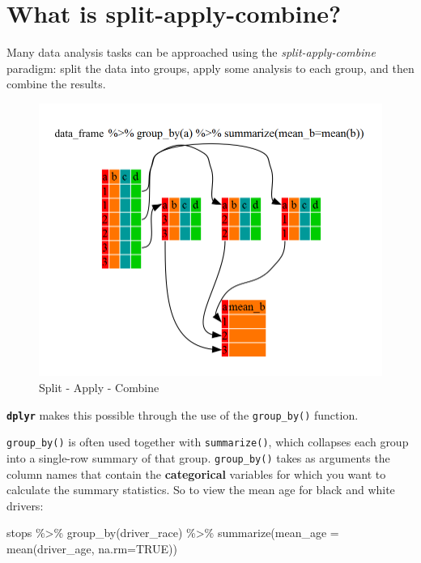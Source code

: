 \documentclass[
]{book}
\newenvironment{Shaded}{\begin{snugshade}}{\end{snugshade}}
\newcommand{\AttributeTok}[1]{\textcolor[rgb]{0.77,0.63,0.00}{#1}}
\newcommand{\ConstantTok}[1]{\textcolor[rgb]{0.00,0.00,0.00}{#1}}
\newcommand{\FunctionTok}[1]{\textcolor[rgb]{0.00,0.00,0.00}{#1}}
\newcommand{\NormalTok}[1]{#1}
\newcommand{\SpecialCharTok}[1]{\textcolor[rgb]{0.00,0.00,0.00}{#1}}
\begin{document}
\hypertarget{what-is-split-apply-combine}{%
\section{What is split-apply-combine?}\label{what-is-split-apply-combine}}

Many data analysis tasks can be approached using the \emph{split-apply-combine}
paradigm: split the data into groups, apply some analysis to each group, and
then combine the results.

\begin{figure}
\includegraphics[width=\textwidth]{img/split-apply-combine} \caption{Split - Apply - Combine}\label{fig:split-apply-combine}
\end{figure}

\textbf{\texttt{dplyr}} makes this possible through the use of the \texttt{group\_by()} function.

\texttt{group\_by()} is often used together with \texttt{summarize()}, which collapses each
group into a single-row summary of that group. \texttt{group\_by()} takes as arguments
the column names that contain the \textbf{categorical} variables for which you want
to calculate the summary statistics. So to view the mean age for black and white drivers:

\begin{Shaded}
\begin{Highlighting}[]
\NormalTok{stops }\SpecialCharTok{\%\textgreater{}\%}
  \FunctionTok{group\_by}\NormalTok{(driver\_race) }\SpecialCharTok{\%\textgreater{}\%}
  \FunctionTok{summarize}\NormalTok{(}\AttributeTok{mean\_age =} \FunctionTok{mean}\NormalTok{(driver\_age, }\AttributeTok{na.rm=}\ConstantTok{TRUE}\NormalTok{))}
\end{Highlighting}
\end{Shaded}
\end{document}
